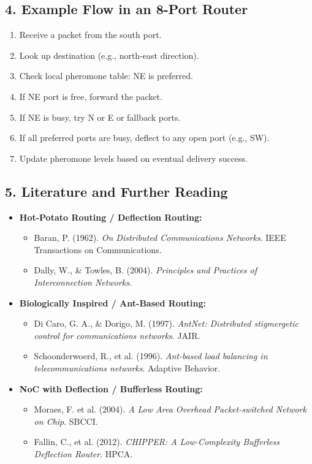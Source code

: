 \documentclass[../OAE-SPEC-MAIN.tex]{subfiles}
\begin{document}
\subsection*{4. Example Flow in an 8-Port Router}

\begin{enumerate}
    \item Receive a packet from the south port.
    \item Look up destination (e.g., north-east direction).
    \item Check local pheromone table: NE is preferred.
    \item If NE port is free, forward the packet.
    \item If NE is busy, try N or E or fallback ports.
    \item If all preferred ports are busy, deflect to any open port (e.g., SW).
    \item Update pheromone levels based on eventual delivery success.
\end{enumerate}

\subsection*{5. Literature and Further Reading}

\begin{itemize}
    \item \textbf{Hot-Potato Routing / Deflection Routing:}
    \begin{itemize}
        \item Baran, P. (1962). \textit{On Distributed Communications Networks}. IEEE Transactions on Communications.
        \item Dally, W., \& Towles, B. (2004). \textit{Principles and Practices of Interconnection Networks}.
    \end{itemize}
    
    \item \textbf{Biologically Inspired / Ant-Based Routing:}
    \begin{itemize}
        \item Di Caro, G. A., \& Dorigo, M. (1997). \textit{AntNet: Distributed stigmergetic control for communications networks}. JAIR.
        \item Schoonderwoerd, R., et al. (1996). \textit{Ant-based load balancing in telecommunications networks}. Adaptive Behavior.
    \end{itemize}

    \item \textbf{NoC with Deflection / Bufferless Routing:}
    \begin{itemize}
        \item Moraes, F. et al. (2004). \textit{A Low Area Overhead Packet-switched Network on Chip}. SBCCI.
        \item Fallin, C., et al. (2012). \textit{CHIPPER: A Low-Complexity Bufferless Deflection Router}. HPCA.
    \end{itemize}
\end{itemize}
\end{document}
